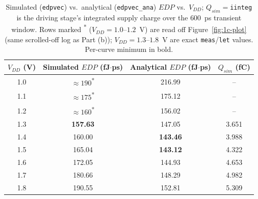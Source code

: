 \begin{table}[h]
  \centering
  \begin{tabular}{|c|c|c|c|}
    \hline
    $V_{DD}$ (V) & Simulated $EDP$ (fJ$\cdot$ps) & Analytical $EDP$ (fJ$\cdot$ps) & $Q_{sim}$ (fC) \\
    \hline
    1.0 & $\approx190$\textsuperscript{*} & 216.99 & -- \\
    1.1 & $\approx175$\textsuperscript{*} & 175.12 & -- \\
    1.2 & $\approx160$\textsuperscript{*} & 156.02 & -- \\
    1.3 & \textbf{157.63} & 147.05 & 3.651 \\
    1.4 & 160.00 & \textbf{143.46} & 3.988 \\
    1.5 & 165.04 & \textbf{143.12} & 4.322 \\
    1.6 & 172.05 & 144.93 & 4.653 \\
    1.7 & 180.66 & 148.29 & 4.982 \\
    1.8 & 190.55 & 152.81 & 5.309 \\
    \hline
  \end{tabular}
  \caption{Simulated (\texttt{edpvec}) vs.\ analytical (\texttt{edpvec\_ana})
  $EDP$ vs.\ $V_{DD}$; $Q_{sim}=$\texttt{iinteg} is the driving stage's
  integrated supply charge over the $600$~ps transient window. Rows marked
  \textsuperscript{*} ($V_{DD}=1.0$--$1.2$~V) are read off
  Figure~\ref{fig:1c-plot} (same scrolled-off log as Part (b));
  $V_{DD}=1.3$--$1.8$~V are exact \texttt{meas}/\texttt{let} values.
  Per-curve minimum in bold.}
  \label{tab:1c-sim}
\end{table}

